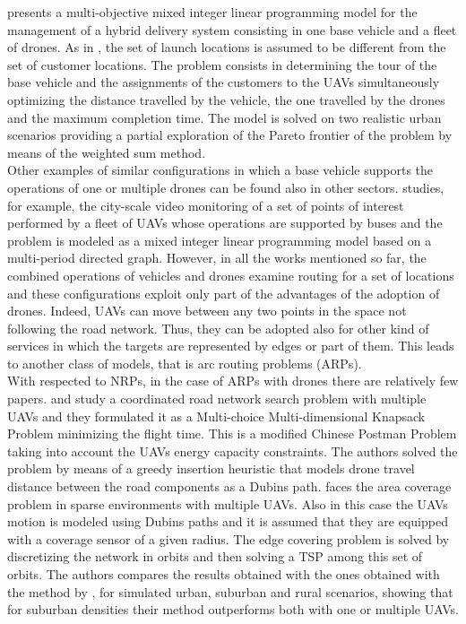 \cite{art:Amorosi2020} presents a multi-objective mixed integer linear programming model for the management of a hybrid delivery system consisting in one base vehicle and a fleet of drones. As in \cite{art:Poikonen2020}, the set of launch locations is assumed to be different from the set of customer locations. The problem consists in determining the tour of the base vehicle and the assignments of the customers to the UAVs simultaneously optimizing the distance travelled by the vehicle, the one travelled by the drones and the maximum completion time. The model is solved on two realistic urban scenarios providing a partial exploration of the Pareto frontier of the problem by means of the weighted sum method.\\
Other examples of similar configurations in which a base vehicle supports the operations of one or multiple drones can be found also in other sectors. 
\cite{art:Trotta2018} studies, for example, the city-scale video monitoring of a set of points of interest performed by a fleet of UAVs whose operations are supported by buses and the problem is modeled as a mixed integer linear programming model based on a multi-period directed graph.
However, in all the works mentioned so far, the combined operations of vehicles and drones examine routing for a set of locations and these configurations exploit only part of the advantages of the adoption of drones. Indeed, UAVs can move between any two points in the space not following the road network. Thus, they can be adopted also for other kind of services in which the targets are represented by edges or part of them. This leads to another class of models, that is arc routing problems (ARPs).\\
With respected to NRPs, in the case of ARPs with drones there are relatively few papers. \cite{art:Oh2011} and \cite{art:Oh2014} study a coordinated road network search problem with multiple UAVs and they formulated it as a Multi-choice Multi-dimensional Knapsack Problem minimizing the flight time. This is a modified Chinese Postman Problem taking into account the UAVs energy capacity constraints. The authors solved the problem by means of a greedy insertion heuristic that models drone travel distance between the road components as a Dubins path.
\cite{art:Dille2013} faces the area coverage problem in sparse environments with multiple UAVs. Also in this case the UAVs motion is modeled using Dubins paths and it is assumed that they are equipped with a coverage sensor of a given radius.
The edge covering problem is solved by discretizing the network in orbits and then solving a TSP among this set of orbits. The authors compares the results obtained with the ones obtained with the method by \cite{art:Oh2014}, for simulated urban, suburban and rural scenarios, showing that for suburban densities their method outperforms both with one or multiple UAVs. 
